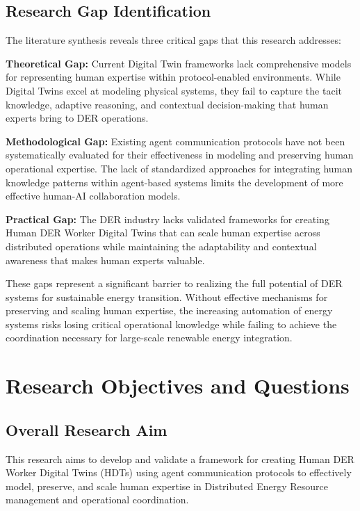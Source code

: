 \documentclass[12pt,a4paper]{article}
\begin{document}
\subsection{Research Gap Identification}

The literature synthesis reveals three critical gaps that this research addresses:

\textbf{Theoretical Gap:} Current Digital Twin frameworks lack comprehensive models for representing human expertise within protocol-enabled environments. While Digital Twins excel at modeling physical systems, they fail to capture the tacit knowledge, adaptive reasoning, and contextual decision-making that human experts bring to DER operations.

\textbf{Methodological Gap:} Existing agent communication protocols have not been systematically evaluated for their effectiveness in modeling and preserving human operational expertise. The lack of standardized approaches for integrating human knowledge patterns within agent-based systems limits the development of more effective human-AI collaboration models.

\textbf{Practical Gap:} The DER industry lacks validated frameworks for creating Human DER Worker Digital Twins that can scale human expertise across distributed operations while maintaining the adaptability and contextual awareness that makes human experts valuable.

These gaps represent a significant barrier to realizing the full potential of DER systems for sustainable energy transition. Without effective mechanisms for preserving and scaling human expertise, the increasing automation of energy systems risks losing critical operational knowledge while failing to achieve the coordination necessary for large-scale renewable energy integration.

\section{Research Objectives and Questions}
\label{sec:objectives}

\subsection{Overall Research Aim}

This research aims to develop and validate a framework for creating Human DER Worker Digital Twins (HDTs) using agent communication protocols to effectively model, preserve, and scale human expertise in Distributed Energy Resource management and operational coordination.
\end{document}
